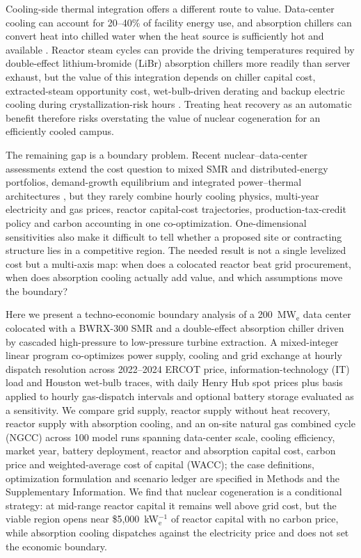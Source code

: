 \documentclass[sn-vancouver,Numbered]{sn-jnl}%
\begin{document}
Cooling-side thermal integration offers a different route to value. Data-center cooling can account for 20--40\% of facility energy use, and absorption chillers can convert heat into chilled water when the heat source is sufficiently hot and available \citep{ebrahimi2014review,yuan2023wasteHeatReview,amiri2021}. Reactor steam cycles can provide the driving temperatures required by double-effect lithium-bromide (LiBr) absorption chillers more readily than server exhaust, but the value of this integration depends on chiller capital cost, extracted-steam opportunity cost, wet-bulb-driven derating and backup electric cooling during crystallization-risk hours \citep{srikhirin2001absorption,herold2016absorption,cui2025switchable}. Treating heat recovery as an automatic benefit therefore risks overstating the value of nuclear cogeneration for an efficiently cooled campus.

The remaining gap is a boundary problem. Recent nuclear--data-center assessments extend the cost question to mixed SMR and distributed-energy portfolios, demand-growth equilibrium and integrated power--thermal architectures \citep{debnath2025smrDER,you2025dynamicEquilibrium,bhowmik2026nuclearDC,zhang2026nuclearDC}, but they rarely combine hourly cooling physics, multi-year electricity and gas prices, reactor capital-cost trajectories, production-tax-credit policy and carbon accounting in one co-optimization. One-dimensional sensitivities also make it difficult to tell whether a proposed site or contracting structure lies in a competitive region. The needed result is not a single levelized cost but a multi-axis map: when does a colocated reactor beat grid procurement, when does absorption cooling actually add value, and which assumptions move the boundary?

Here we present a techno-economic boundary analysis of a 200~MW$_\mathrm{e}$ data center colocated with a BWRX-300 SMR and a double-effect absorption chiller driven by cascaded high-pressure to low-pressure turbine extraction. A mixed-integer linear program co-optimizes power supply, cooling and grid exchange at hourly dispatch resolution across 2022--2024 ERCOT price, information-technology (IT) load and Houston wet-bulb traces, with daily Henry Hub spot prices plus basis applied to hourly gas-dispatch intervals and optional battery storage evaluated as a sensitivity. We compare grid supply, reactor supply without heat recovery, reactor supply with absorption cooling, and an on-site natural gas combined cycle (NGCC) across 100 model runs spanning data-center scale, cooling efficiency, market year, battery deployment, reactor and absorption capital cost, carbon price and weighted-average cost of capital (WACC); the case definitions, optimization formulation and scenario ledger are specified in Methods and the Supplementary Information. We find that nuclear cogeneration is a conditional strategy: at mid-range reactor capital it remains well above grid cost, but the viable region opens near \$5{,}000~kW$_\mathrm{e}^{-1}$ of reactor capital with no carbon price, while absorption cooling dispatches against the electricity price and does not set the economic boundary.
\end{document}
